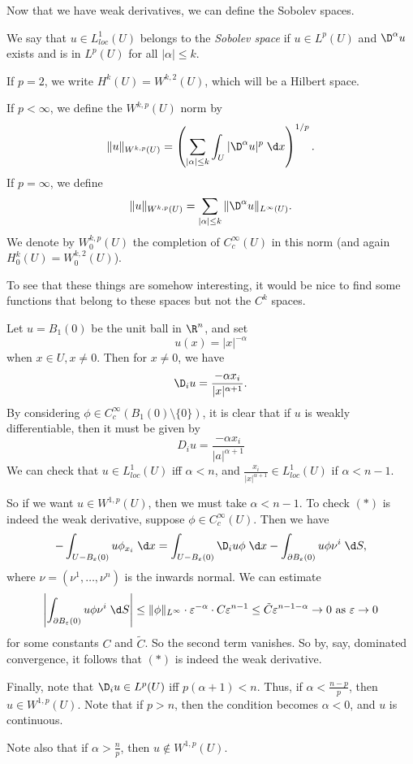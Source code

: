 \documentclass[a4paper]{article}
\begin{document}
Now that we have weak derivatives, we can define the Sobolev spaces.

\begin{defi}
  We say that $u \in L^1_{loc}(U)$ belongs to the \emph{Sobolev space}  if $u \in L^p(U)$ and $\D^\alpha u$ exists and is in $L^p(U)$ for all $|\alpha| \leq k$.

  If $p = 2$, we write $H^k(U) = W^{k, 2}(U)$, which will be a Hilbert space.

  If $p < \infty$, we define the $W^{k, p}(U)$ norm by
  \[
    \|u\|_{W^{k, p}(U)} = \left(\sum_{|\alpha| \leq k}\int_U |\D^\alpha u|^p \;\d x \right)^{1/p}.
  \]
  If $p = \infty$, we define
  \[
    \|u\|_{W^{k, p}(U)} = \sum_{|\alpha|\leq k} \|\D^\alpha u\|_{L^\infty(U)}.
  \]
  We denote by $W_0^{k, p}(U)$ the completion of $C_c^\infty(U)$ in this norm (and again $H^k_0(U) = W^{k, 2}_0(U)$).
\end{defi}

To see that these things are somehow interesting, it would be nice to find some functions that belong to these spaces but not the $C^k$ spaces.

\begin{eg}
  Let $u = B_1(0)$ be the unit ball in $\R^n$, and set
  \[
    u(x) = |x|^{-\alpha}
  \]
  when $x \in U, x \not= 0$. Then for $x \not= 0$, we have
  \[
    \D_i u = \frac{-\alpha x_i}{|x|^{\alpha + 1}}.
  \]
  By considering $\phi \in C_c^\infty(B_1(0) \setminus \{0\})$, it is clear that if $u$ is weakly differentiable, then it must be given by
  \[
    D_i u = \frac{-\alpha x_i}{|a|^{\alpha + 1}}\tag{$*$}
  \]
  We can check that $u \in L^1_{loc} (U)$ iff $\alpha < n$, and $\frac{x_i}{|x|^{\alpha + 1}} \in L^1_{loc}(U)$ if $\alpha < n - 1$.

  So if we want $u \in W^{1, p}(U)$, then we must take $\alpha < n - 1$. To check $(*)$ is indeed the weak derivative, suppose $\phi \in C^\infty_c(U)$. Then we have
  \[
    - \int_{U - B_\varepsilon(0)}u \phi_{x_i} \;\d x = \int_{U - B_\varepsilon(0)} \D_i u \phi \;\d x - \int_{\partial B_\varepsilon(0)} u \phi \nu^i \;\d S,
  \]
  where $\nu = (\nu^1, \ldots, \nu^n)$ is the inwards normal. We can estimate
  \[
    \left|\int_{\partial B_\varepsilon(0)}u \phi \nu^i \;\d S\right| \leq \|\phi\|_{L^\infty} \cdot \varepsilon^{-\alpha } \cdot C \varepsilon^{n - 1} \leq \tilde{C} \varepsilon^{n - 1 - \alpha} \to 0\text{ as }\varepsilon \to 0
  \]
  for some constants $C$ and $\tilde{C}$. So the second term vanishes. So by, say, dominated convergence, it follows that $(*)$ is indeed the weak derivative.

  Finally, note that $\D_i u \in L^p(U)$ iff $p(\alpha + 1) < n$. Thus, if $\alpha < \frac{n - p}{p}$, then $u \in W^{1, p}(U)$. Note that if $p > n$, then the condition becomes $\alpha < 0$, and $u$ is continuous.

  Note also that if $\alpha > \frac{n}{p}$, then $u \not \in W^{1,p}(U)$.
\end{eg}
\end{document}
